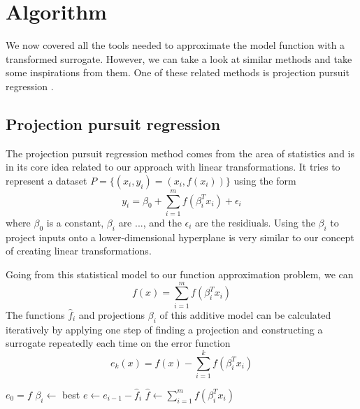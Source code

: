 \documentclass[
  a4paper,  %
  twoside,  %
  bibliography=totoc,
  headsepline,
  cleardoublepage=empty,
  parskip=half,
  draft=false
]{scrbook}
\begin{document}
\chapter{Algorithm}

We now covered all the tools needed to approximate the model function with a transformed surrogate.
However, we can take a look at similar methods and take some inspirations from them.
One of these related methods is projection pursuit regression \cite{}.

\section{Projection pursuit regression}

The projection pursuit regression method comes from the area of statistics and is in its core idea related to our approach with linear transformations.
It tries to represent a dataset $P=\{(x_i, y_i)=(x_i, f(x_i))\}$ using the form
\begin{equation}
y_i=\beta_0 + \sum_{i=1}^m f(\beta_i^T x_i) + \epsilon_i
\end{equation}
where $\beta_0$ is a constant, $\beta_i$ are ..., and the $\epsilon_i$ are the residiuals.
Using the $\beta_i$ to project inputs onto a lower-dimensional hyperplane is very similar to our concept of creating linear transformations.


Going from this statistical model to our function approximation problem, we can 
\begin{equation}
f(x)=\sum_{i=1}^m f(\beta_i^T x_i)
\end{equation}
The functions $\hat{f}_i$ and projections $\beta_i$ of this additive model can be calculated iteratively by applying one step of finding a projection and constructing a surrogate repeatedly each time on the error function
\begin{equation}
e_k(x)=f(x) - \sum_{i=1}^k f(\beta_i^T x_i)
\end{equation}

\begin{algorithm}[H]
\normalsize
\begin{algorithmic}
    \State $e_0 = f$
    	\State $\beta_i \gets$ best
    	\State $e \gets e_{i - 1} - \hat{f}_i$
    \EndFor
    \State $\hat{f} \gets \sum_{i=1}^m f(\beta_i^T x_i)$
    \State {}
\EndFunction
\end{algorithmic}
\end{algorithm}
\end{document}
